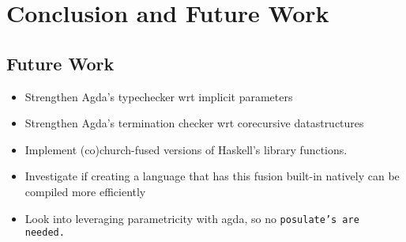 \section{Conclusion and Future Work}



\subsection{Future Work}
\begin{itemize}
    \item Strengthen Agda's typechecker wrt implicit parameters
    \item Strengthen Agda's termination checker wrt corecursive datastructures
    \item Implement (co)church-fused versions of Haskell's library functions.
    \item Investigate if creating a language that has this fusion built-in natively can be compiled more efficiently
    \item Look into leveraging parametricity with agda, so no \tt{posulate}'s are needed.
\end{itemize}
